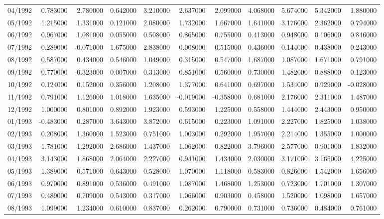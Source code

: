 \begin{tabular}{lrrrrrrrrrr}
04/1992 & 0.783000 & 2.780000 & 0.642000 & 3.210000 & 2.637000 & 2.099000 & 4.068000 & 5.674000 & 5.342000 & 1.880000 \\
05/1992 & 1.215000 & 1.331000 & 0.121000 & 2.080000 & 1.732000 & 1.667000 & 1.641000 & 3.176000 & 2.362000 & 0.794000 \\
06/1992 & 0.967000 & 1.081000 & 0.055000 & 0.508000 & 0.865000 & 0.755000 & 0.413000 & 0.948000 & 0.106000 & 0.846000 \\
07/1992 & 0.289000 & -0.071000 & 1.675000 & 2.838000 & 0.008000 & 0.515000 & 0.436000 & 0.144000 & 0.438000 & 0.243000 \\
08/1992 & 0.587000 & 0.434000 & 0.546000 & 1.049000 & 0.315000 & 0.547000 & 1.687000 & 1.087000 & 1.671000 & 0.791000 \\
09/1992 & 0.770000 & -0.323000 & 0.007000 & 0.313000 & 0.851000 & 0.560000 & 0.730000 & 1.482000 & 0.888000 & 0.123000 \\
10/1992 & 0.124000 & 0.152000 & 0.356000 & 1.208000 & 1.377000 & 0.641000 & 0.697000 & 1.534000 & 0.929000 & -0.028000 \\
11/1992 & 0.791000 & 1.126000 & 1.018000 & 1.635000 & -0.019000 & -0.358000 & 0.681000 & 2.176000 & 2.311000 & 1.487000 \\
12/1992 & 1.000000 & 0.801000 & 0.892000 & 1.923000 & 0.593000 & 1.225000 & 0.558000 & 1.444000 & 2.443000 & 0.950000 \\
01/1993 & -0.483000 & 0.287000 & 3.643000 & 3.872000 & 0.615000 & 0.223000 & 1.091000 & 2.227000 & 1.825000 & 1.038000 \\
02/1993 & 0.208000 & 1.360000 & 1.523000 & 0.751000 & 1.003000 & 0.292000 & 1.957000 & 2.214000 & 1.355000 & 1.000000 \\
03/1993 & 1.781000 & 1.292000 & 2.686000 & 1.437000 & 1.062000 & 0.822000 & 3.796000 & 2.577000 & 0.901000 & 1.832000 \\
04/1993 & 3.143000 & 1.868000 & 2.064000 & 2.227000 & 0.941000 & 1.434000 & 2.030000 & 3.171000 & 3.165000 & 4.225000 \\
05/1993 & 1.389000 & 0.571000 & 0.643000 & 0.528000 & 1.070000 & 1.118000 & 0.583000 & 0.826000 & 1.542000 & 1.656000 \\
06/1993 & 0.970000 & 0.891000 & 0.536000 & 0.491000 & 1.087000 & 1.468000 & 1.253000 & 0.723000 & 1.701000 & 1.307000 \\
07/1993 & 0.489000 & 0.709000 & 0.543000 & 0.317000 & 1.066000 & 0.903000 & 0.458000 & 1.520000 & 1.098000 & 1.657000 \\
08/1993 & 1.099000 & 1.234000 & 0.610000 & 0.837000 & 0.262000 & 0.790000 & 0.731000 & 0.736000 & 0.484000 & 0.761000 \\

\end{tabular}
